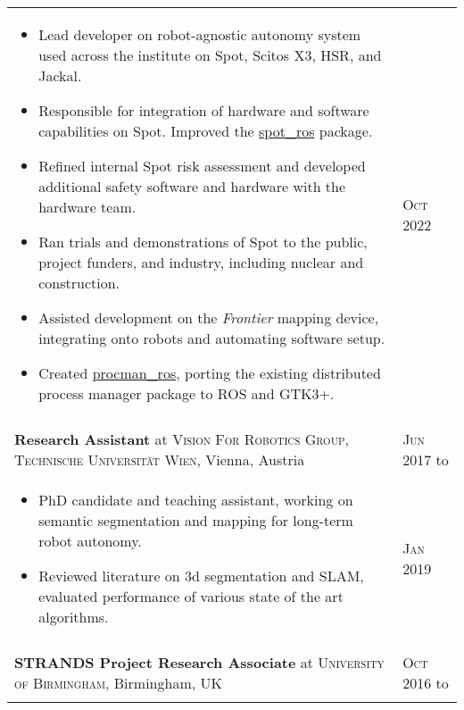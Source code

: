 \documentclass[a4paper,10pt]{article}
\newcommand{\datelen}{1.8cm}
\newcommand{\descrlen}{15.5cm}
\begin{document}
\begin{tabular}{p{\descrlen}|p{\datelen}}
  \small{
  \vspace{-0.4cm}
  \begin{itemize}
    \item Lead developer on robot-agnostic autonomy system used across the institute on Spot, Scitos X3, HSR, and Jackal.
    \item Responsible for integration of hardware and software capabilities on Spot. Improved the \href{https://github.com/clearpathrobotics/spot_ros}{spot\_ros} package.
    \item Refined internal Spot risk assessment and developed additional safety software and hardware  with the hardware team.
    \item Ran trials and demonstrations of Spot to the public, project funders, and industry, including nuclear and construction.
    \item Assisted development on the \emph{Frontier} mapping device, integrating onto robots and automating software setup.
    \item Created \href{https://github.com/ori-drs/procman_ros}{procman\_ros}, porting the existing distributed process manager package to ROS and GTK3+.
    \vspace{-0.5cm}
  \end{itemize}
  }&\textsc{Oct 2022}\\
  \multicolumn{2}{c}{} \\[-0.2cm]
  \textbf{Research Assistant} at \textsc{Vision For Robotics Group, Technische Universit{\"a}t Wien}, Vienna, Austria& \textsc{Jun 2017} to\\
  \small{
  \vspace{-0.4cm}
  \begin{itemize}
  \item PhD candidate and teaching assistant, working on semantic segmentation and mapping for long-term robot autonomy.
  \item Reviewed literature on 3d segmentation and SLAM, evaluated performance of various state of the art algorithms.
  \vspace{-0.5cm}
  \end{itemize}}&\textsc{Jan 2019}\\
  \multicolumn{2}{c}{} \\[-0.2cm]
  \textbf{STRANDS Project Research Associate} at \textsc{University of Birmingham}, Birmingham, UK & \textsc{Oct 2016} to\\
  \small{
    \vspace{-0.4cm}
  \begin{itemize}

\end{itemize}}
\end{tabular}
\end{document}

